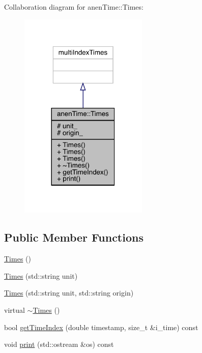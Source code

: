 Collaboration diagram for anen\+Time\+:\+:Times\+:\nopagebreak
\begin{figure}[H]
\begin{center}
\leavevmode
\includegraphics[width=173pt]{classanen_time_1_1_times__coll__graph}
\end{center}
\end{figure}
\subsection*{Public Member Functions}
\begin{DoxyCompactItemize}
\item 
\mbox{\hyperlink{classanen_time_1_1_times_a66161eb232f580fe090579b8e19e3618}{Times}} ()
\item 
\mbox{\hyperlink{classanen_time_1_1_times_a2bd2c89fd910120a72eab80017792125}{Times}} (std\+::string unit)
\item 
\mbox{\hyperlink{classanen_time_1_1_times_a73794184536377320073427409a63da6}{Times}} (std\+::string unit, std\+::string origin)
\item 
virtual \mbox{\hyperlink{classanen_time_1_1_times_abd871e7729adf2622a3e5ed41945aa3c}{$\sim$\+Times}} ()
\item 
bool \mbox{\hyperlink{classanen_time_1_1_times_a2100e11524b814628670820204890a09}{get\+Time\+Index}} (double timestamp, size\+\_\+t \&i\+\_\+time) const
\item 
void \mbox{\hyperlink{classanen_time_1_1_times_aec5c8186b68d51239dbee83a7303e5d0}{print}} (std\+::ostream \&os) const
\end{DoxyCompactItemize}
